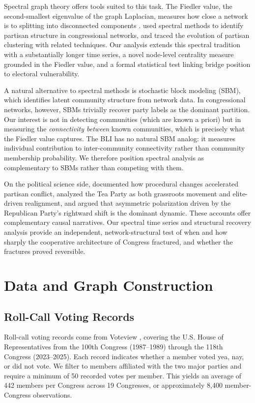 \documentclass[12pt, a4paper]{article}
\begin{document}
Spectral graph theory offers tools suited to this task. The Fiedler value, the second-smallest eigenvalue of the graph Laplacian, measures how close a network is to splitting into disconnected components \citep{fiedler1973}. \citet{newman2006} used spectral methods to identify partisan structure in congressional networks, and \citet{moody2013} traced the evolution of partisan clustering with related techniques. Our analysis extends this spectral tradition with a substantially longer time series, a novel node-level centrality measure grounded in the Fiedler value, and a formal statistical test linking bridge position to electoral vulnerability.

A natural alternative to spectral methods is stochastic block modeling (SBM), which identifies latent community structure from network data. In congressional networks, however, SBMs trivially recover party labels as the dominant partition. Our interest is not in detecting communities (which are known a priori) but in measuring the \textit{connectivity between} known communities, which is precisely what the Fiedler value captures. The BLI has no natural SBM analog: it measures individual contribution to inter-community connectivity rather than community membership probability. We therefore position spectral analysis as complementary to SBMs rather than competing with them.

On the political science side, \citet{theriault2008} documented how procedural changes accelerated partisan conflict, \citet{skocpol2012} analyzed the Tea Party as both grassroots movement and elite-driven realignment, and \citet{mann2012} argued that asymmetric polarization driven by the Republican Party's rightward shift is the dominant dynamic. These accounts offer complementary causal narratives. Our spectral time series and structural recovery analysis provide an independent, network-structural test of when and how sharply the cooperative architecture of Congress fractured, and whether the fractures proved reversible.

\section{Data and Graph Construction}

\subsection{Roll-Call Voting Records}

Roll-call voting records come from Voteview \citep{lewis2023}, covering the U.S. House of Representatives from the 100th Congress (1987--1989) through the 118th Congress (2023--2025). Each record indicates whether a member voted yea, nay, or did not vote. We filter to members affiliated with the two major parties and require a minimum of 50 recorded votes per member. This yields an average of 442 members per Congress across 19 Congresses, or approximately 8,400 member-Congress observations.
\end{document}
